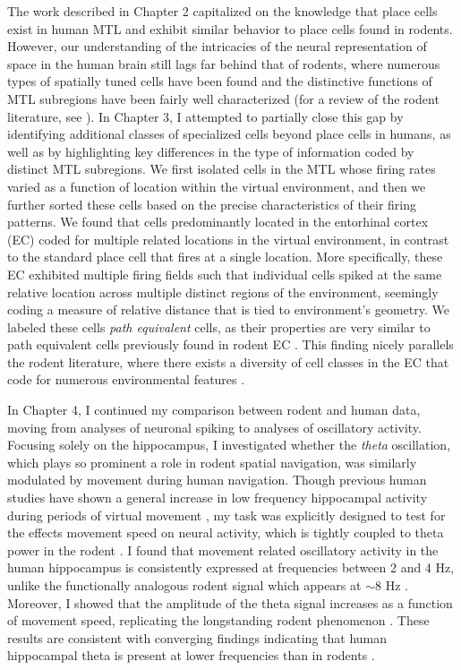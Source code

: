 The work described in Chapter 2 capitalized on the knowledge that place cells exist in human MTL and exhibit similar behavior to place cells found in rodents. However, our understanding of the intricacies of the neural representation of space in the human brain still lags far behind that of rodents, where numerous types of spatially tuned cells have been found and the distinctive functions of MTL subregions have been fairly well characterized (for a review of the rodent literature, see \cite{MoseEtal08}). In Chapter 3, I attempted to partially close this gap by identifying additional classes of specialized cells beyond place cells in humans, as well as by highlighting key differences in the type of information coded by distinct MTL subregions. We first isolated cells in the MTL whose firing rates varied as a function of location within the virtual environment, and then we further sorted these cells based on the precise characteristics of their firing patterns. We found that cells predominantly located in the entorhinal cortex (EC) coded for multiple related locations in the virtual environment, in contrast to the standard place cell that  fires at a single location. More specifically, these EC exhibited multiple firing fields such that individual cells spiked at the same relative location across multiple distinct regions of the environment, seemingly coding a measure of relative distance that is tied to environment's geometry. We labeled these cells \textit{path equivalent} cells, as their properties are very similar to path equivalent cells previously found in rodent EC \citep{FranEtal00}. This finding nicely parallels the rodent literature, where there exists a diversity of cell classes in the EC that code for numerous environmental features \citep{HartEtal05,FyhnEtal04,DerdEtal09,SargEtal06,SolsEtal08}.

In Chapter 4, I continued my comparison between rodent and human data, moving from analyses of neuronal spiking to analyses of oscillatory activity. Focusing solely on the hippocampus, I investigated whether the \textit{theta} oscillation, which plays so prominent a role in rodent spatial navigation, was similarly modulated by movement during human navigation. Though previous human studies have shown a general increase in low frequency hippocampal activity during periods of virtual movement \citep{CaplEtal03,EkstEtal05,JacoEtal10c}, my task was explicitly designed to test for the effects movement speed on neural activity, which is tightly coupled to theta power in the rodent \citep{Vand69}. I found that movement related oscillatory activity in the human hippocampus is consistently expressed at frequencies between 2 and 4 Hz, unlike the functionally analogous rodent signal which appears at $\sim$8 Hz \citep{Buzs02}. Moreover, I showed that the amplitude of the theta signal increases as a function of movement speed, replicating the longstanding rodent phenomenon \citep{McFaEtal75}. These results are consistent with converging findings indicating that human hippocampal theta is present at lower frequencies than in rodents \citep{WatrEtal13a,Jaco14}.

